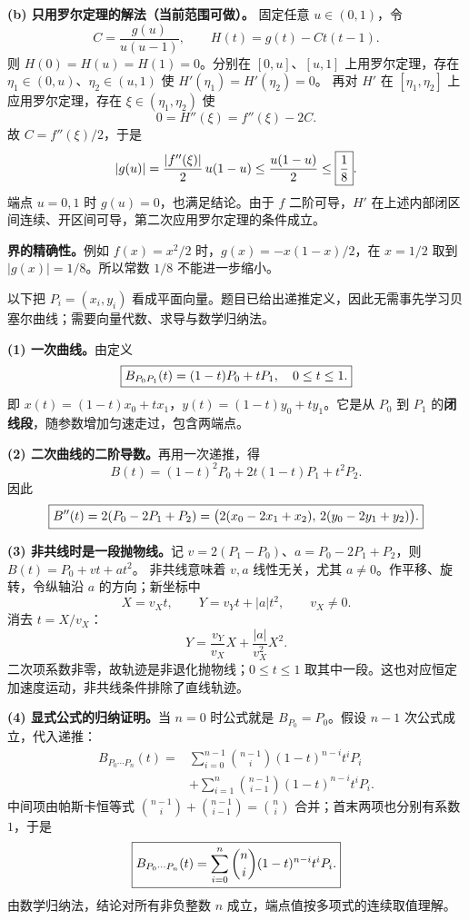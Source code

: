 \textbf{(b) 只用罗尔定理的解法（当前范围可做）。}
固定任意 $u\in(0,1)$，令
\[
C=\frac{g(u)}{u(u-1)},\qquad H(t)=g(t)-Ct(t-1).
\]
则 $H(0)=H(u)=H(1)=0$。分别在 $[0,u]$、$[u,1]$ 上用罗尔定理，存在
$\eta_1\in(0,u)$、$\eta_2\in(u,1)$ 使 $H'(\eta_1)=H'(\eta_2)=0$。
再对 $H'$ 在 $[\eta_1,\eta_2]$ 上应用罗尔定理，存在 $\xi\in(\eta_1,\eta_2)$ 使
\[
0=H''(\xi)=f''(\xi)-2C.
\]
故 $C=f''(\xi)/2$，于是
\[
|g(u)|=\frac{|f''(\xi)|}2\,u(1-u)
\le\frac{u(1-u)}2\le\boxed{\frac18}.
\]
端点 $u=0,1$ 时 $g(u)=0$，也满足结论。由于 $f$ 二阶可导，$H'$ 在上述内部闭区间连续、开区间可导，第二次应用罗尔定理的条件成立。

\textbf{界的精确性。}例如 $f(x)=x^2/2$ 时，$g(x)=-x(1-x)/2$，在 $x=1/2$ 取到 $|g(x)|=1/8$。所以常数 $1/8$ 不能进一步缩小。

\newpage
{}
以下把 $P_i=(x_i,y_i)$ 看成平面向量。题目已给出递推定义，因此无需事先学习贝塞尔曲线；需要向量代数、求导与数学归纳法。

\textbf{(1) 一次曲线。}由定义
\[
\boxed{B_{P_0P_1}(t)=(1-t)P_0+tP_1,\quad0\le t\le1.}
\]
即 $x(t)=(1-t)x_0+tx_1$，$y(t)=(1-t)y_0+ty_1$。它是从 $P_0$ 到 $P_1$ 的\textbf{闭线段}，随参数增加匀速走过，包含两端点。

\textbf{(2) 二次曲线的二阶导数。}再用一次递推，得
\[
B(t)=(1-t)^2P_0+2t(1-t)P_1+t^2P_2.
\]
因此
\[
\boxed{B''(t)=2(P_0-2P_1+P_2)
=\bigl(2(x_0-2x_1+x_2),\,2(y_0-2y_1+y_2)\bigr).}
\]

\textbf{(3) 非共线时是一段抛物线。}记 $v=2(P_1-P_0)$、$a=P_0-2P_1+P_2$，则
$B(t)=P_0+vt+at^2$。
非共线意味着 $v,a$ 线性无关，尤其 $a\ne0$。作平移、旋转，令纵轴沿 $a$ 的方向；新坐标中
\[
X=v_Xt,\qquad Y=v_Yt+|a|t^2,\qquad v_X\ne0.
\]
消去 $t=X/v_X$：
\[
Y=\frac{v_Y}{v_X}X+\frac{|a|}{v_X^2}X^2.
\]
二次项系数非零，故轨迹是非退化抛物线；$0\le t\le1$ 取其中一段。这也对应恒定加速度运动，非共线条件排除了直线轨迹。

\textbf{(4) 显式公式的归纳证明。}当 $n=0$ 时公式就是 $B_{P_0}=P_0$。假设 $n-1$ 次公式成立，代入递推：
\begin{align*}
B_{P_0\cdots P_n}(t)
={}&\sum_{i=0}^{n-1}\binom{n-1}{i}(1-t)^{n-i}t^iP_i\\
&+\sum_{i=1}^{n}\binom{n-1}{i-1}(1-t)^{n-i}t^iP_i.
\end{align*}
中间项由帕斯卡恒等式 $\binom{n-1}{i}+\binom{n-1}{i-1}=\binom ni$ 合并；首末两项也分别有系数 $1$，于是
\[
\boxed{B_{P_0\cdots P_n}(t)=\sum_{i=0}^n\binom ni(1-t)^{n-i}t^iP_i.}
\]
由数学归纳法，结论对所有非负整数 $n$ 成立，端点值按多项式的连续取值理解。

